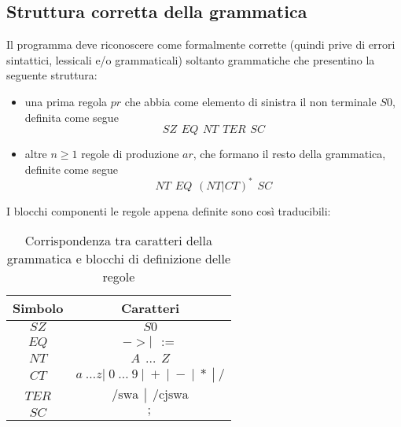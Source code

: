 \documentclass[12pt]{article}
\begin{document}
\subsection{Struttura corretta della grammatica}\label{struttura}
Il programma deve riconoscere come formalmente corrette (quindi prive di errori sintattici, lessicali e/o grammaticali) soltanto grammatiche che presentino la seguente struttura:
\begin{itemize}
\item una prima regola $pr$ che abbia come elemento di sinistra il non terminale $S0$, definita come segue
$$
SZ \hspace{5pt} EQ \hspace{5pt} NT \hspace{5pt} TER \hspace{5pt} SC
$$
\item altre $n \geq 1$ regole di produzione $ar$, che formano il resto della grammatica, definite come segue
$$
NT \hspace{5pt} EQ \hspace{5pt} \left( NT \left| CT \right. \right)^* \hspace{5pt} SC
$$
\end{itemize}
I blocchi componenti le regole appena definite sono così traducibili:
\begin{table}[h]
\centering
\begin{tabular}{|c|c|}
\hline
\textbf{Simbolo} & \textbf{Caratteri} \\
\hline
$SZ$ & $S0$ \\
\hline
$EQ$ & $-> \left| \hspace{5pt} := \right.$ \\
\hline
$NT$ & $A \hspace{5pt} \dots \hspace{5pt} Z$ \\
\hline
$CT$ & $a \hspace{3pt} \dots z \left| \hspace{3pt} 0 \hspace{3pt} \dots \hspace{3pt} 9 \hspace{3pt} \right| \hspace{3pt} + \hspace{3pt} \left| \hspace{3pt} - \hspace{3pt} \right| \hspace{3pt} * \hspace{3pt} \left| \hspace{3pt} / \right.$ \\
\hline
$TER$ & $\text{/swa} \hspace{5pt} \left| \hspace{5pt} \text{/cjswa} \right.$ \\
\hline
$SC$ & $;$ \\
\hline
\end{tabular}
\caption{Corrispondenza tra caratteri della grammatica e blocchi di definizione delle regole}
\end{table}
\end{document}

